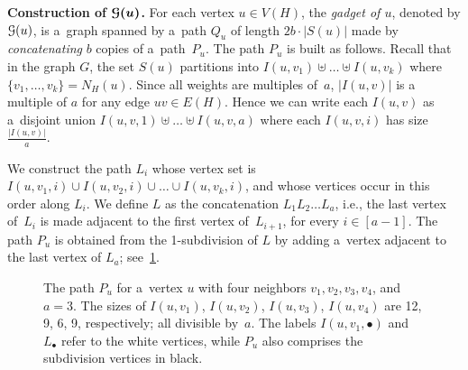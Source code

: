 \documentclass[a4paper,UKenglish,cleveref,hyperref,autoref]{lipics-v2021}
\begin{document}
\medskip

\textbf{Construction of $\bm{\mathcal G(u)}$.}
For each vertex $u \in V(H)$, the \emph{gadget of $u$}, denoted by $\mathcal G(u)$, is a~graph spanned by a~path $Q_u$ of length $2b \cdot |S(u)|$ made by \emph{concatenating} $b$ copies of a~path~$P_u$.
The path $P_u$ is built as follows.
Recall that in the graph $G$, the set $S(u)$ partitions into $I(u, v_1) \uplus \dots \uplus I(u, v_k)$ where $\{v_1, \dots, v_k\} = N_H(u)$.
Since all weights are multiples of~$a$, $|I(u, v)|$ is a multiple of $a$ for any edge $uv \in E(H)$.
Hence we can write each $I(u, v)$ as a~disjoint union $I(u, v, 1) \uplus \dots \uplus I(u, v, a)$ where each $I(u, v, i)$ has size $\frac{|I(u, v)|}{a}$.

We construct the path $L_i$ whose vertex set is $I(u, v_1, i) \cup I(u, v_2, i) \cup \dots \cup I(u, v_k, i)$, and whose vertices occur in this order along $L_i$.
We define $L$ as the concatenation $L_1 L_2\dots L_a$, i.e., the last vertex of~$L_i$ is made adjacent to the first vertex of~$L_{i+1}$, for every $i \in [a-1]$.
The path $P_u$ is obtained from the 1-subdivision of $L$ by adding a~vertex adjacent to the last vertex of $L_a$; see~\cref{fig:Pu}.

\begin{figure}[h!]
  \centering
  \caption{The path $P_u$ for a~vertex $u$ with four neighbors $v_1, v_2, v_3, v_4$, and $a = 3$.
    The sizes of $I(u,v_1)$, $I(u,v_2)$, $I(u,v_3)$, $I(u,v_4)$ are 12, 9, 6, 9, respectively; all divisible by~$a$.
    The labels $I(u,v_1,\bullet)$ and $L_{\bullet}$ refer to the white vertices, while $P_u$ also comprises the subdivision vertices in black.}
  \label{fig:Pu}
\end{figure}
\end{document}

